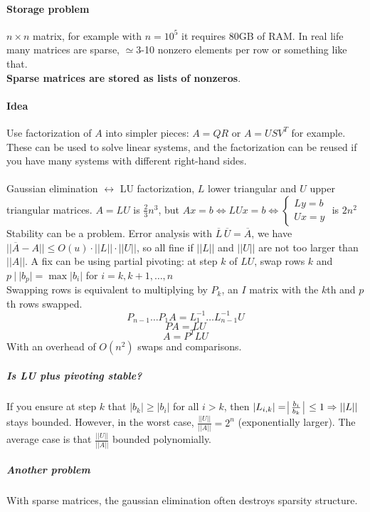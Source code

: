 \documentclass[10pt]{report}
\begin{document}
\paragraph{Storage problem} $n\times n$ matrix, for example with $n=10^5$ it requires 80GB of RAM. In real life many matrices are sparse, $\simeq$3-10 nonzero elements per row or something like that.\\
\textbf{Sparse matrices are stored as lists of nonzeros}.
\paragraph{Idea} Use factorization of $A$ into simpler pieces: $A=QR$ or $A=USV^T$ for example. These can be used to solve linear systems, and the factorization can be reused if you have many systems with different right-hand sides.\\\\
Gaussian elimination $\leftrightarrow$ LU factorization, $L$ lower triangular and $U$ upper triangular matrices. $A = LU$ is $\frac{2}{3}n^3$, but $Ax=b\Leftrightarrow LUx = b\Leftrightarrow\left\{\begin{array}{l}
Ly=b\\Ux=y
\end{array}\right.$ is $2n^2$\\
Stability can be a problem. Error analysis with $\overline{L}\,\overline{U} = \overline{A}$, we have $||\overline{A}-A||\leq O(u)\cdot||L||\cdot||U||$, so all fine if $||L||$ and $||U||$ are not too larger than $||A||$. A fix can be using partial pivoting: at step $k$ of $LU$, swap rows $k$ and\\$p\:|\:|b_p|=\max|b_i|$ for $i=k,k+1,\ldots,n$\\
Swapping rows is equivalent to multiplying by $P_k$, an $I$ matrix with the $k$th and $p$th rows swapped.
$$P_{n-1}\ldots P_1A=L_1^{-1}\ldots L_{n-1}^{-1}U$$
$$PA = LU$$
$$A = P^TLU$$
With an overhead of $O(n^2)$ swaps and comparisons.
\subparagraph{Is LU plus pivoting stable?} If you ensure at step $k$ that $|b_k|\geq |b_i|$ for all $i>k$, then $|L_{i,k}| = \:\vline\frac{b_i}{b_k}\:\vline\:\leq 1 \Rightarrow ||L||$ stays bounded. However, in the worst case, $\frac{||U||}{||A||} = 2^n$ (exponentially larger). The average case is that $\frac{||U||}{||A||}$ bounded polynomially.
\subparagraph{Another problem} With sparse matrices, the gaussian elimination often destroys sparsity structure.
\end{document}
